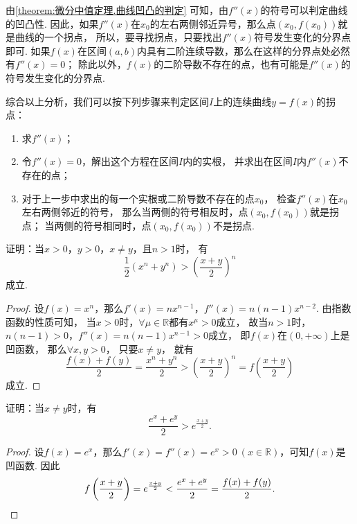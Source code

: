 由\cref{theorem:微分中值定理.曲线凹凸的判定} 可知，由\(f''(x)\)的符号可以判定曲线的凹凸性.
因此，如果\(f''(x)\)在\(x_0\)的左右两侧邻近异号，那么点\((x_0,f(x_0))\)就是曲线的一个拐点，
所以，要寻找拐点，只要找出\(f''(x)\)符号发生变化的分界点即可.
如果\(f(x)\)在区间\((a,b)\)内具有二阶连续导数，那么在这样的分界点处必然有\(f''(x)=0\)；
除此以外，\(f(x)\)的二阶导数不存在的点，也有可能是\(f''(x)\)的符号发生变化的分界点.

{\color{red}综合以上分析，我们可以按下列步骤来判定区间\(I\)上的连续曲线\(y=f(x)\)的拐点：
\begin{enumerate}
\item 求\(f''(x)\)；

\item 令\(f''(x) = 0\)，解出这个方程在区间\(I\)内的实根，
并求出在区间\(I\)内\(f''(x)\)不存在的点；

\item 对于上一步中求出的每一个实根或二阶导数不存在的点\(x_0\)，
检查\(f''(x)\)在\(x_0\)左右两侧邻近的符号，
那么当两侧的符号相反时，点\((x_0,f(x_0))\)就是拐点；
当两侧的符号相同时，点\((x_0,f(x_0))\)不是拐点.
\end{enumerate}}

\begin{example}
证明：当\(x>0\)，\(y>0\)，\(x \neq y\)，且\(n>1\)时，
有\begin{equation}\label{equation:微分中值定理.平均数的比较1}
\frac{1}{2} (x^n+y^n) > \left(\frac{x+y}{2}\right)^n
\end{equation}成立.
\begin{proof}
设\(f(x) = x^n\)，那么\(f'(x) = n x^{n-1}\)，\(f''(x) = n(n-1) x^{n-2}\).
由指数函数的性质可知，
当\(x > 0\)时，\(\forall \mu \in \mathbb{R}\)都有\(x^{\mu} > 0\)成立，
故当\(n > 1\)时，\(n(n-1)>0\)，\(f''(x) = n(n-1) x^{n-1} > 0\)成立，
即\(f(x)\)在\((0,+\infty)\)上是凹函数，
那么\(\forall x,y>0\)，
只要\(x \neq y\)，
就有\[
	\frac{f(x)+f(y)}{2} = \frac{x^n+y^n}{2}
	> \left(\frac{x+y}{2}\right)^n = f\left(\frac{x+y}{2}\right)
\]成立.
\end{proof}
\end{example}

\begin{example}
证明：当\(x \neq y\)时，有\begin{equation}
\frac{e^x + e^y}{2} > e^{\frac{x+y}{2}}.
\end{equation}
\begin{proof}
设\(f(x) = e^x\)，那么\(f'(x) = f''(x) = e^x > 0\ (x\in\mathbb{R})\)，可知\(f(x)\)是凹函数.
因此\[
f\left(\frac{x+y}{2}\right) = e^{\frac{x+y}{2}}
< \frac{e^x+e^y}{2} = \frac{f(x)+f(y)}{2}.
\qedhere
\]
\end{proof}
\end{example}

